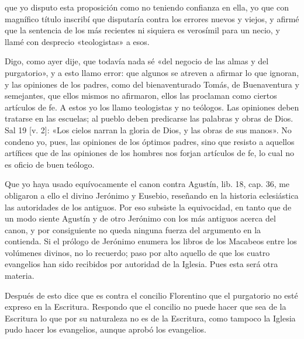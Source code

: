 que yo disputo esta proposición como no teniendo confianza en ella, yo que con magnífico título inscribí que disputaría contra los errores nuevos y viejos, y afirmé que la sentencia de los más recientes ni siquiera es verosímil para un necio, y llamé con desprecio «teologistas» a esos.

Digo, como ayer dije, que todavía nada sé «del negocio de las almas y del purgatorio», y a esto llamo error: que algunos se atreven a afirmar lo que ignoran, y las opiniones de los padres, como del bienaventurado Tomás, de Buenaventura y semejantes, que ellos mismos no afirmaron, ellos las proclaman como ciertos artículos de fe. A estos yo los llamo teologistas y no teólogos. Las opiniones deben tratarse en las escuelas; al pueblo deben predicarse las palabras y obras de Dios. Sal 19 [v. 2]: «Los cielos narran la gloria de Dios, y las obras de sus manos». No condeno yo, pues, las opiniones de los óptimos padres, sino que resisto a aquellos artífices que de las opiniones de los hombres nos forjan artículos de fe, lo cual no es oficio de buen teólogo.

Que yo haya usado equívocamente el canon contra Agustín, lib. 18, cap. 36, me obligaron a ello el divino Jerónimo y Eusebio, reseñando en la historia eclesiástica las autoridades de los antiguos. Por eso subsiste la equivocidad, en tanto que de un modo siente Agustín y de otro Jerónimo con los más antiguos acerca del canon, y por consiguiente no queda ninguna fuerza del argumento en la contienda. Si el prólogo de Jerónimo enumera los libros de los Macabeos entre los volúmenes divinos, no lo recuerdo; paso por alto aquello de que los cuatro evangelios han sido recibidos por autoridad de la Iglesia. Pues esta será otra materia.

Después de esto dice que es contra el concilio Florentino que el purgatorio no esté expreso en la Escritura. Respondo que el concilio no puede hacer que sea de la Escritura lo que por su naturaleza no es de la Escritura, como tampoco la Iglesia pudo hacer los evangelios, aunque aprobó los evangelios.

